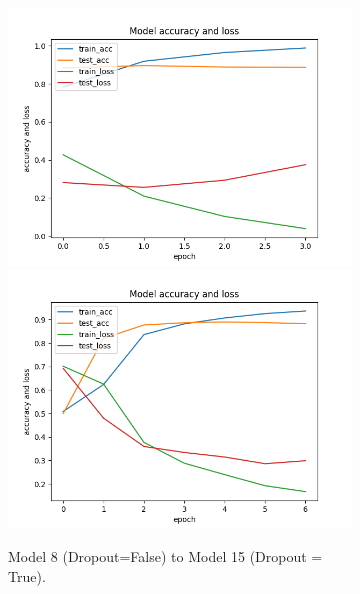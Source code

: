 \documentclass[11pt]{article}
\begin{document}
\begin{figure}[h!]
\centering
\begin{subfigure}{0.35\textwidth}
         \centering
         \includegraphics[width=\textwidth]{model8.png}
		 \includegraphics[width=\textwidth]{model15.png}
         \caption{Model 8 (Dropout=False) to Model 15 (Dropout = True).}
         \label{fig:dropout1}
\end{subfigure}
\hfill
\begin{subfigure}{0.35\textwidth}
         \centering

\end{subfigure}
\end{figure}
\end{document}
